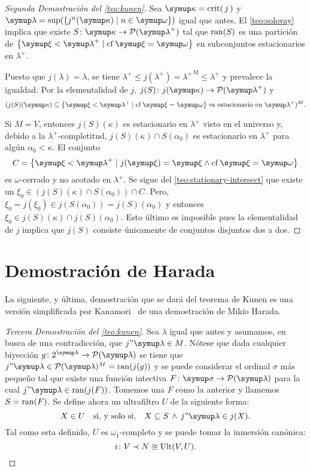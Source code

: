 \begin{proof}[Segunda Demostración del \cref{teo:kunen}]
	Sea $\kappa=\crit{j}$ y $\lambda=\sup(\set{j^n(\kappa)\mid n\in\omega})$ igual que antes.
	El \cref{teo:solovay} implica que existe $S\colon\kappa\to\pwset{\lambda^+}$ tal que
	$\operatorname{ran}(S)$ es una partición de $\set{\xi < \lambda^+\mid \cf\xi = \omega}$ en subconjuntos
	estacionarios en $\lambda^+$.

	Puesto que $j(\lambda)=\lambda$, se tiene $\lambda^+\leq j(\lambda^+) = {\lambda^+}^M\leq \lambda^+$
	y prevalece la igualdad. Por la elementalidad de $j$, $j(S)\colon j(\kappa)\to\pwset{\lambda^+}$ y
	\[
		(
		    j(S)(\kappa)\subseteq\set{\xi < \lambda^+\mid \cf\xi = \omega}
		    \,\text{es estacionario en $\lambda^+$}
		)^M.
	\]

	Si $M=V$, entonces $j(S)(\kappa)$ es estacionario en $\lambda^+$ visto en el universo y,
	debido a la $\lambda^+$-completitud, $j(S)(\kappa)\cap S(\alpha_0)$ es estacionario en $\lambda^+$
	para algún $\alpha_0<\kappa$. El conjunto
	\[
	    C = \set{\xi<\lambda^+\mid j(\xi)=\xi \land \cf\xi=\omega}
	\]
	es $\omega$-cerrado y no acotado en $\lambda^+$. Se sigue del \cref{teo:stationary-intersect} que
	existe un $\xi_0\in (j(S)(\kappa)\cap S(\alpha_0))\cap C$. Pero,
	$\xi_0 = j(\xi_0)\in j(S(\alpha_0)) = j(S)(\alpha_0)$ y entonces $\xi_0\in j(S)(\kappa)\cap j(S)(\alpha_0)$.
	Esto último es imposible pues la elementalidad de $j$ implica que $j(S)$ consiste únicamente de conjuntos
	disjuntos dos a dos.
\end{proof}

\section{Demostración de Harada}

La siguiente, y última, demostración que se dará del teorema de Kunen es una versión simplificada
por Kanamori~\autocite{kanamori_higher_2009} de una demostración de Mikio Harada.

\begin{proof}[Tercera Demostración del \cref{teo:kunen}]
    Sea $\lambda$ igual que antes y asumamos, en busca de una contradicción, que $j"\lambda\in M$.
    Nótese que dada cualquier biyección $g\colon 2^\lambda\to\pwset{\lambda}$ se tiene que
    $j"\lambda\in\pwset{\lambda}^M = \ran(j(g))$ y se puede considerar el ordinal $\sigma$ más
    pequeño tal que existe una función intectiva $F\colon\sigma\to\pwset{\lambda}$ para la cual
    $j"\lambda\in \ran(j(F))$. Tomemos una $F$ como la anterior y llamemos $S=\operatorname{ran}(F)$.
    Se define ahora un ultrafiltro $U$ de la siguiente forma:
    \[
        X\in U\quad\text{si, y solo si,}\quad X\subseteq S \,\land\, j"\lambda\in j(X).
    \]
    Tal como esta definido, $U$ es $\omega_1$-completo y se puede tomar la inmersión canónica:
    \[
        i\colon V\prec N\approxeq\operatorname{Ult}(V, U).
    \]
\end{proof}

